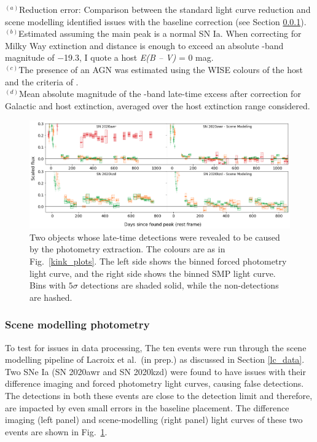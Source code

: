 \documentclass[a4paper,oneside,12pt, class=Latex/Classes/PhDthesisPSnPDF, crop=false]{standalone}
\begin{document}
\begin{table}
{\begin{tabular}{lccccccccccccc}
   \hline
 \end{tabular}}
 \label{alt_trans_res}
\begin{flushleft}
$^{(a)}$Reduction error: Comparison between the standard light curve reduction and scene modelling identified issues with the baseline correction (see Section \ref{sec:scene_modelling}).\\
$^{(b)}$Estimated assuming the main peak is a normal SN Ia. When correcting for Milky Way extinction and distance is enough to exceed an absolute \ztfg-band magnitude of $-$19.3, I quote a host \textit{E(B -- V)} = 0 mag. \\
$^{(c)}$The presence of an AGN was estimated using the WISE colours of the host and the criteria of \cite{WISE_crit}.\\
$^{(d)}$Mean absolute magnitude of the \ztfr-band late-time excess after correction for Galactic and host extinction, averaged over the host extinction range considered.\\
\end{flushleft}
\end{table} 

\begin{figure}
 \centering
 \includegraphics[width=\textwidth]{../Images/chapter_3/other_red_err_plots.png}
 \caption{Two objects whose late-time detections were revealed to be caused by the photometry extraction. The colours are as in Fig.~\ref{kink_plots}. The left side shows the binned forced photometry light curve, and the right side shows the binned SMP light curve. Bins with $5\sigma$ detections are shaded solid, while the non-detections are hashed.}
 \label{other_red_errs}
\end{figure}


\subsubsection{Scene modelling photometry}
\label{sec:scene_modelling}
To test for issues in data processing, The ten events were run through the scene modelling pipeline of Lacroix et al.~(in prep.) as discussed in Section \ref{lc_data}. Two SNe Ia (SN 2020awr and SN 2020kzd) were found to have issues with their difference imaging and forced photometry light curves, causing false detections. The detections in both these events are close to the detection limit and therefore, are impacted by even small errors in the baseline placement. The difference imaging (left panel) and scene-modelling (right panel) light curves of these two events are shown in Fig.~\ref{other_red_errs}. 
\end{document}
